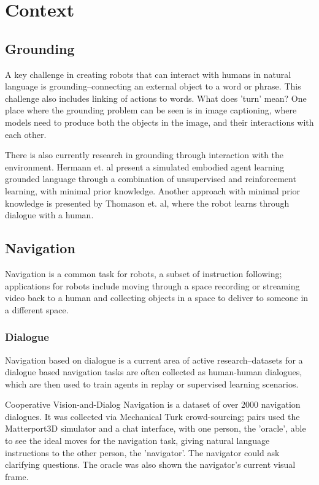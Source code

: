 \documentclass{article}
\begin{document}
\section{Context}
\subsection{Grounding}
A key challenge in creating robots that can interact with humans in natural language is grounding--connecting an external object to a word or phrase. This challenge also includes linking of actions to words. What does 'turn' mean? One place where the grounding problem can be seen is in image captioning, where models need to produce both the objects in the image, and their interactions with each other\cite{karpathy2014captioning}.

There is also currently research in grounding through interaction with the environment. Hermann et. al present a simulated embodied agent learning grounded language through a combination of unsupervised and reinforcement learning, with minimal prior knowledge\cite{hermann2017grounded}. Another approach with minimal prior knowledge is presented by Thomason et. al, where the robot learns through dialogue with a human\cite{thomason2019grounded}.

\subsection{Navigation}
Navigation is a common task for robots, a subset of instruction following; applications for robots include moving through a space recording or streaming video back to a human and collecting objects in a space to deliver to someone in a different space. 
\subsubsection{Dialogue}
Navigation based on dialogue is a current area of active research--datasets for a dialogue based navigation tasks are often collected as human-human dialogues, which are then used to train agents in replay or supervised learning scenarios. 

Cooperative Vision-and-Dialog Navigation is a dataset of over 2000 navigation dialogues\cite{thomason2019visionanddialog}. It was collected via Mechanical Turk crowd-sourcing; pairs used the Matterport3D simulator and a chat interface, with one person, the ’oracle’, able to see the ideal moves for the navigation task, giving natural language instructions to the other person, the ’navigator'. The navigator could ask clarifying questions. The oracle was also shown the navigator's current visual frame. 
\end{document}
